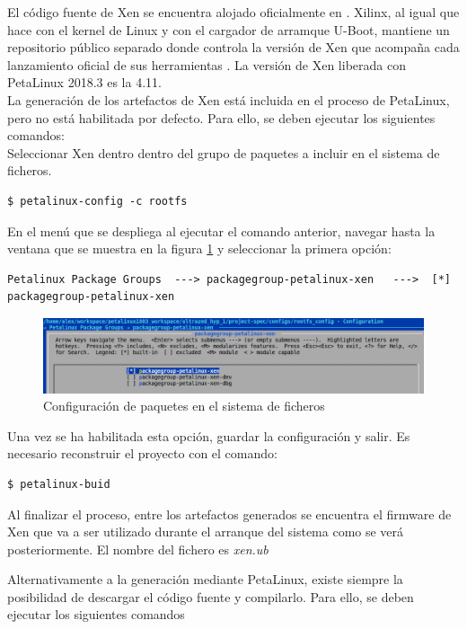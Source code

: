 El código fuente de Xen se encuentra alojado oficialmente en \cite{xen_source}. Xilinx, al igual que hace con el kernel de Linux y con el cargador de arramque U-Boot, mantiene un repositorio público separado donde controla la versión de Xen que acompaña cada lanzamiento oficial de sus herramientas \cite{xen_source_xilinx}. La versión de Xen liberada con PetaLinux 2018.3 es la 4.11.\\
La generación de los artefactos de Xen está incluida en el proceso de PetaLinux, pero no está habilitada por defecto. Para ello, se deben ejecutar los siguientes comandos:\\
Seleccionar Xen dentro dentro del grupo de paquetes a incluir en el sistema de ficheros.
\begin{lstlisting}[style=CStyle]
$ petalinux-config -c rootfs
\end{lstlisting}

En el menú que se despliega al ejecutar el comando anterior, navegar hasta la ventana que se muestra en la figura \ref{fig:xen_menuconfig_1} y seleccionar la primera opción:
\begin{lstlisting}[style=CStyle]
Petalinux Package Groups  ---> packagegroup-petalinux-xen   --->  [*] packagegroup-petalinux-xen
\end{lstlisting}

\begin{figure}[!h]
  \centering
  \includegraphics[width=1.0\textwidth]{recursos/petalinux_xen_1.png}
  \caption{Configuración de paquetes en el sistema de ficheros}
  \label{fig:xen_menuconfig_1}
\end{figure}

Una vez se ha habilitada esta opción, guardar la configuración y salir. Es necesario reconstruir el proyecto con el comando:
\begin{lstlisting}[style=CStyle]
$ petalinux-buid
\end{lstlisting}

Al finalizar el proceso, entre los artefactos generados se encuentra el firmware de Xen que va a ser utilizado durante el arranque del sistema como se verá posteriormente. El nombre del fichero es \textit{xen.ub}

Alternativamente a la generación mediante PetaLinux, existe siempre la posibilidad de descargar el código fuente y compilarlo. Para ello, se deben ejecutar los siguientes comandos \cite{xen_source_xilinx}

